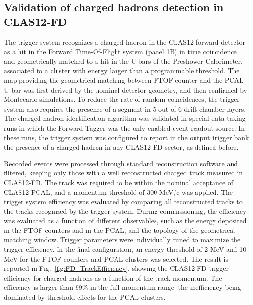 \subsection{Validation of charged hadrons detection in CLAS12-FD}

The trigger system recognizes a charged hadron in the CLAS12 forward detector as a hit in the Forward Time-Of-Flight system (panel 1B) in time coincidence and geometrically matched to a hit in the U-bars of the Preshower Calorimeter, associated to a cluster with energy larger than a programmable threshold. The map providing the geometrical matching between FTOF counter and the PCAL U-bar was first derived by the nominal detector geometry, and then confirmed by Montecarlo simulations. To reduce the rate of random coincidences, the trigger system also requires the presence of a segment in 5 out of 6 drift chamber layers. The charged hadron identification algorithm was validated in special data-taking runs in which the Forward Tagger was the only enabled event readout source. In these runs, the trigger system was configured to report in the output trigger bank the presence of a charged hadron in any CLAS12-FD sector, as defined before. 

Recorded events were processed through standard reconstruction software and filtered, keeping only those with a well reconstructed charged track measured in CLAS12-FD. The track was required to be within the nominal acceptance of CLAS12 PCAL, and a momentum threshold of 300 MeV/c was applied. The trigger system efficiency was evaluated by comparing all reconstructed tracks to the tracks recognized by the trigger system. During commissioning, the efficiency was evaluated as a function of different observables, such as the energy deposited in the FTOF counters and in the PCAL, and the topology of the geometrical matching window. Trigger parameters were individually tuned to maximize the trigger efficiency. In the final configuration, an energy threshold of 2 MeV and 10 MeV for the FTOF counters and PCAL clusters was selected.  The result is reported in Fig.~\ref{fig:FD_TrackEfficiency}, showing the CLAS12-FD trigger efficiency for charged hadrons as a function of the track momentum. The efficiency is larger than 99$\%$ in the full momentum range, the inefficiency being dominated by threshold effects for the PCAL clusters.

